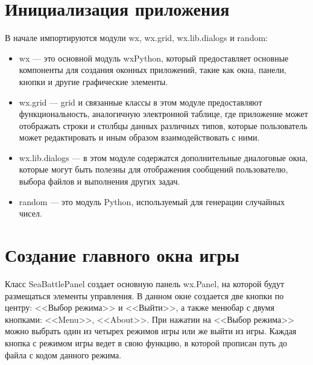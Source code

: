 \section{\label{sec:ch02/sec02}Инициализация приложения}
В начале импортируются модули wx, wx.grid, wx.lib.dialogs и random:
\begin{itemize}
\item wx --- это основной модуль wxPython, который предоставляет основные компоненты для создания оконных приложений, такие как окна, панели, кнопки и другие графические элементы.
\item wx.grid --- grid и связанные классы в этом модуле предоставляют функциональность, аналогичную электронной таблице, где приложение может отображать строки и столбцы данных различных типов, которые пользователь может редактировать и иным образом взаимодействовать с ними.
\item wx.lib.dialogs --- в этом модуле содержатся дополнительные диалоговые окна, которые могут быть полезны для отображения сообщений пользователю, выбора файлов и выполнения других задач.
\item random --- это модуль Python, используемый для генерации случайных чисел.
\end{itemize}

\section{\label{sec:ch02/sec03}Создание главного окна игры}
Класс SeaBattlePanel создает основную панель wx.Panel, на которой будут размещаться элементы управления. В данном окне создается две кнопки по центру: <<Выбор режима>> и <<Выйти>>, а также менюбар с двумя кнопками: <<Menu>>, <<About>>. 
При нажатии на <<Выбор режима>> можно выбрать один из четырех режимов игры или же выйти из игры.
Каждая кнопка с режимом игры ведет в свою функцию, в которой прописан путь до файла с кодом данного режима.


